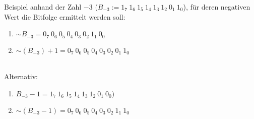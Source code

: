 \noindent
Beispiel anhand der Zahl $-3$ ($B_{-3}:= 1_7\ 1_6\ 1_5\ 1_4\ 1_3\ 1_2\ 0_1\ 1_0$), für deren negativen Wert die Bitfolge ermittelt werden soll:

\begin{enumerate}
    \item $\sim B_{-3} = 0_7\ 0_6\ 0_5\ 0_4\ 0_3\ 0_2\ 1_1\ 0_0$
    \item $\sim (B_{-3}) + 1 = 0_7\ 0_6\ 0_5\ 0_4\ 0_3\ 0_2\ 0_1\ 1_0$
\end{enumerate}\\

Alternativ:
\begin{enumerate}
    \item $B_{-3} -1 = 1_7\ 1_6\ 1_5\ 1_4\ 1_3\ 1_2\ 0_1\ 0_0)$
    \item $\sim (B_{-3} - 1) = 0_7\ 0_6\ 0_5\ 0_4\ 0_3\ 0_2\ 1_1\ 1_0$
\end{enumerate}\\

